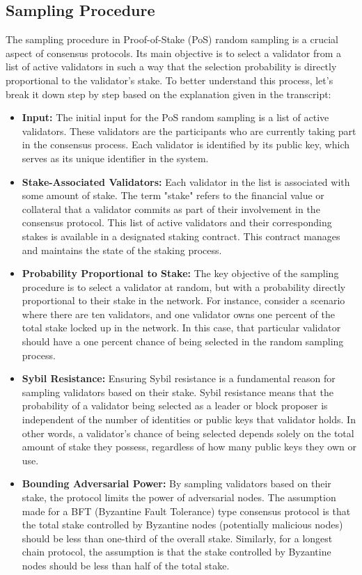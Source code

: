\subsection{Sampling Procedure}
The sampling procedure in Proof-of-Stake (PoS) random sampling is a crucial aspect of consensus protocols. Its main objective is to select a validator from a list of active validators in such a way that the selection probability is directly proportional to the validator's stake. To better understand this process, let's break it down step by step based on the explanation given in the transcript:

\begin{itemize}[label=--]
\item \textbf{Input:} The initial input for the PoS random sampling is a list of active validators. These validators are the participants who are currently taking part in the consensus process. Each validator is identified by its public key, which serves as its unique identifier in the system.

\item \textbf{Stake-Associated Validators:} Each validator in the list is associated with some amount of stake. The term "stake" refers to the financial value or collateral that a validator commits as part of their involvement in the consensus protocol. This list of active validators and their corresponding stakes is available in a designated staking contract. This contract manages and maintains the state of the staking process.

\item \textbf{Probability Proportional to Stake:} The key objective of the sampling procedure is to select a validator at random, but with a probability directly proportional to their stake in the network. For instance, consider a scenario where there are ten validators, and one validator owns one percent of the total stake locked up in the network. In this case, that particular validator should have a one percent chance of being selected in the random sampling process.

\item \textbf{Sybil Resistance:} Ensuring Sybil resistance is a fundamental reason for sampling validators based on their stake. Sybil resistance means that the probability of a validator being selected as a leader or block proposer is independent of the number of identities or public keys that validator holds. In other words, a validator's chance of being selected depends solely on the total amount of stake they possess, regardless of how many public keys they own or use.

\item \textbf{Bounding Adversarial Power:} By sampling validators based on their stake, the protocol limits the power of adversarial nodes. The assumption made for a BFT (Byzantine Fault Tolerance) type consensus protocol is that the total stake controlled by Byzantine nodes (potentially malicious nodes) should be less than one-third of the overall stake. Similarly, for a longest chain protocol, the assumption is that the stake controlled by Byzantine nodes should be less than half of the total stake.

\end{itemize}
